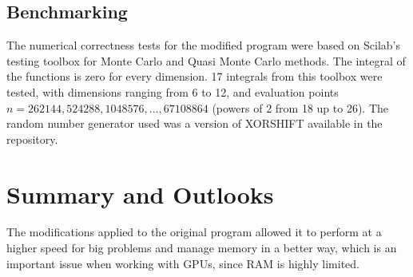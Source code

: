 \documentclass[english]{maciarticle}
\begin{document}
\subsection*{Benchmarking}

The numerical correctness tests for the modified program were based on Scilab's testing toolbox for Monte Carlo and Quasi Monte Carlo methods\cite{baudin}. The integral of the functions is zero for every dimension. 17 integrals from this toolbox were tested, with dimensions ranging from 6 to 12, and evaluation points $n = 262144, 524288, 1048576, \dots, 67108864$ (powers of 2 from 18 up to 26). The random number generator used was a version of XORSHIFT available in the repository.







\section{Summary and Outlooks}
The modifications applied to the original program allowed it to perform at a higher speed for big problems and manage memory in a better way, which is an important issue when working with GPUs, since RAM is highly limited.
\end{document}
